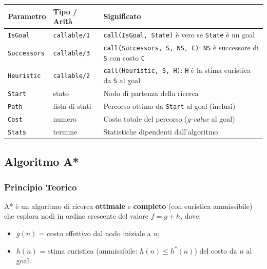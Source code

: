 \documentclass[12pt,a4paper]{article}
\begin{document}
\begin{center}
\renewcommand{\arraystretch}{1.3}
\begin{tabular}{lll}
\toprule
\textbf{Parametro} & \textbf{Tipo / Arità} & \textbf{Significato} \\
\midrule
\texttt{IsGoal}    & \texttt{callable/1}  & \texttt{call(IsGoal, State)} è vero se \texttt{State} è un goal \\
\texttt{Successors}& \texttt{callable/3}  & \texttt{call(Successors, S, NS, C)}: \texttt{NS} è successore di \texttt{S} con costo \texttt{C} \\
\texttt{Heuristic} & \texttt{callable/2}  & \texttt{call(Heuristic, S, H)}: \texttt{H} è la stima euristica da \texttt{S} al goal \\
\texttt{Start}     & stato                & Nodo di partenza della ricerca \\
\texttt{Path}      & lista di stati       & Percorso ottimo da \texttt{Start} al goal (inclusi) \\
\texttt{Cost}      & numero               & Costo totale del percorso (\emph{g-value} al goal) \\
\texttt{Stats}     & termine              & Statistiche dipendenti dall'algoritmo \\
\bottomrule
\end{tabular}
\end{center}

\subsection{Algoritmo A*}

\subsubsection{Principio Teorico}

A* è un algoritmo di ricerca \textbf{ottimale} e \textbf{completo} (con euristica
ammissibile) che esplora nodi in ordine crescente del valore $f = g + h$, dove:
\begin{itemize}[noitemsep]
  \item $g(n)$ = costo effettivo dal nodo iniziale a $n$;
  \item $h(n)$ = stima euristica (ammissibile: $h(n) \le h^*(n)$) del costo da $n$ al goal.
\end{itemize}
\end{document}
